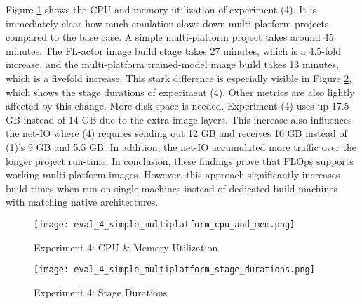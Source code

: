 Figure \ref{fig:eval_4_cpu_and_mem} shows the CPU and memory utilization of experiment (4).
It is immediately clear how much emulation slows down multi-platform projects compared to the base case.
A simple multi-platform project takes around 45 minutes.
The FL-actor image build stage takes 27 minutes, which is a 4.5-fold increase, and the multi-platform trained-model image build takes 13 minutes, which is a fivefold increase.
This stark difference is especially visible in Figure \ref{fig:eval_4_simplest_stage_durations}, which shows the stage durations of experiment (4).
Other metrics are also lightly affected by this change.
More disk space is needed. 
Experiment (4) uses up 17.5 GB instead of 14 GB due to the extra image layers.
This increase also influences the net-IO where (4) requires sending out 12 GB and receives 10 GB instead of (1)'s 9 GB and 5.5 GB.
In addition, the net-IO accumulated more traffic over the longer project run-time.
In conclusion, these findings prove that FLOps supports working multi-platform images.
However, this approach significantly increases build times when run on single machines instead of dedicated build machines with matching native architectures.

\begin{figure}[H]
    \begin{adjustwidth}{-0.2\paperwidth}{-0.2\paperwidth}
        \centering
        \texttt{[image: eval\_4\_simple\_multiplatform\_cpu\_and\_mem.png]}
        \caption{Experiment 4: CPU \& Memory Utilization}
        \label{fig:eval_4_cpu_and_mem}
    \end{adjustwidth}
\end{figure}

\begin{figure}[H]
    \begin{adjustwidth}{-0.2\paperwidth}{-0.2\paperwidth}
        \centering
        \texttt{[image: eval\_4\_simple\_multiplatform\_stage\_durations.png]}
        \caption{Experiment 4: Stage Durations}
        \label{fig:eval_4_simplest_stage_durations}
    \end{adjustwidth}
\end{figure}
